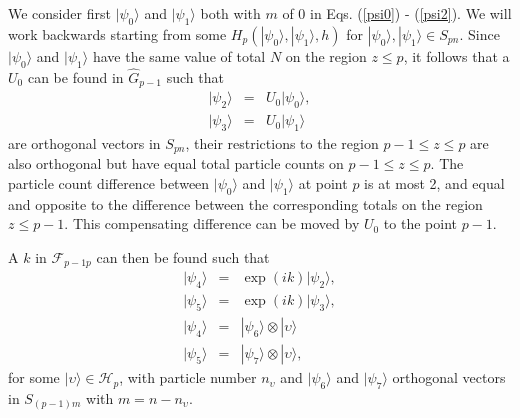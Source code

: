 \documentclass[12pt,amsmath,amssymb,onecolumn]{revtex4-2}
\begin{document}
We consider first $|\psi_0 \rangle $ and $|\psi_1 \rangle $ both with $m$ of 0 in Eqs. (\ref{psi0}) - (\ref{psi2}).
We will work backwards starting from some $H_p( |\psi_0 \rangle , |\psi_1 \rangle , h)$ for $|\psi_0 \rangle , |\psi_1 \rangle  \in S_{p n}$.
Since $|\psi_0 \rangle $ and $|\psi_1 \rangle $ have the same value of total $N$ on the region
$z \le p$, 
it follows that
a $U_0$ can be found in $\hat{G}_{p-1}$ such that
\begin{subequations}
\begin{eqnarray}
\label{u0psi0}
|\psi_2 \rangle  & = & U_0 |\psi_0 \rangle , \\
\label{u0psi1}
|\psi_3 \rangle  & = & U_0 |\psi_1 \rangle 
\end{eqnarray}
\end{subequations}
are orthogonal vectors in $S_{p n}$, their restrictions
to the region $p-1 \le z \le p$ are also orthogonal
but have equal total particle counts 
on $p-1 \le z \le p$.
The particle count difference 
between $|\psi_0 \rangle $ and $|\psi_1 \rangle $ at point $p$ is at most
2, and equal and opposite to the difference between the corresponding
totals on the region $z \le p-1$. This compensating difference can be
moved by $U_0$ to the point $p -1$.

A $k$ in $\mathcal{F}_{p-1 p}$ can
then be found such that
\begin{subequations}
\begin{eqnarray}
\label{u1psi2}
|\psi_4 \rangle  & = & \exp( i k) |\psi_2 \rangle , \\
\label{u1psi3}
|\psi_5 \rangle  & = & \exp( i k)|\psi_3 \rangle , \\
\label{phi4}
|\psi_4 \rangle  & = & |\psi_6 \rangle  \otimes |\upsilon \rangle  \\
\label{phi5}
|\psi_5 \rangle  & = & |\psi_7 \rangle  \otimes |\upsilon \rangle ,
\end{eqnarray}
\end{subequations}
for some $|\upsilon \rangle  \in \mathcal{H}_p$, with particle number $n_{\upsilon}$ and
$|\psi_6 \rangle $ and $|\psi_7 \rangle $ orthogonal vectors in $S_{(p-1) m}$ with $m = n - n_{\upsilon}$.
\end{document}

